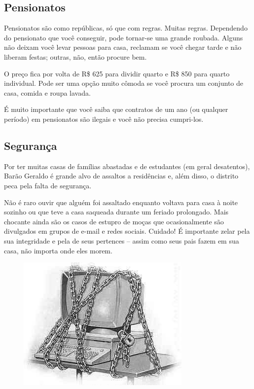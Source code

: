 \subsection{Pensionatos}

Pensionatos são como repúblicas, só que com regras. Muitas regras. Dependendo
do pensionato que você conseguir, pode tornar-se uma grande roubada. Alguns não
deixam você levar pessoas para casa, reclamam se você chegar tarde e não liberam
festas; outras, não, então procure bem.

O preço fica por volta de R\$ 625 para dividir quarto e R\$ 850 para quarto
individual. Pode ser uma opção muito cômoda se você procura um conjunto de casa,
comida e roupa lavada.

É muito importante que você saiba que contratos de um ano (ou qualquer período)
em pensionatos são ilegais e você não precisa cumpri-los.

\subsection{Segurança}

Por ter muitas casas de famílias abastadas e de estudantes (em geral desatentos),
Barão Geraldo é grande alvo de assaltos a residências e, além disso, o distrito
peca pela falta de segurança.

Não é raro ouvir que alguém foi assaltado enquanto voltava para casa à noite
sozinho ou que teve a casa saqueada durante um feriado prolongado. Mais chocante
ainda são os casos de estupro de moças que ocasionalmente são divulgados em
grupos de e-mail e redes sociais. Cuidado! É importante zelar pela sua
integridade e pela de seus pertences -- assim como seus pais fazem em sua casa,
não importa onde eles morem.

\begin{figure}[h!]
    \centering
    \includegraphics[scale=0.55,keepaspectratio=true]{img/imgs/5-moradia/seguranca.jpg}
\end{figure}

